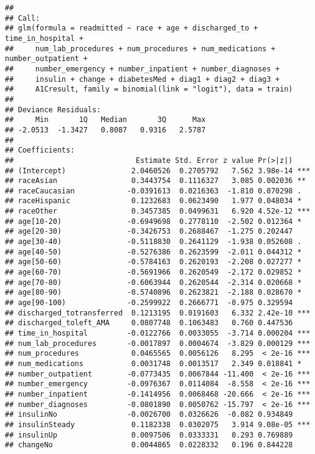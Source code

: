 \documentclass[]{article}
\begin{document}
\begin{verbatim}
## 
## Call:
## glm(formula = readmitted ~ race + age + discharged_to + time_in_hospital + 
##     num_lab_procedures + num_procedures + num_medications + number_outpatient + 
##     number_emergency + number_inpatient + number_diagnoses + 
##     insulin + change + diabetesMed + diag1 + diag2 + diag3 + 
##     A1Cresult, family = binomial(link = "logit"), data = train)
## 
## Deviance Residuals: 
##     Min       1Q   Median       3Q      Max  
## -2.0513  -1.3427   0.8087   0.9316   2.5787  
## 
## Coefficients:
##                            Estimate Std. Error z value Pr(>|z|)    
## (Intercept)               2.0460526  0.2705792   7.562 3.98e-14 ***
## raceAsian                 0.3443754  0.1116327   3.085 0.002036 ** 
## raceCaucasian            -0.0391613  0.0216363  -1.810 0.070298 .  
## raceHispanic              0.1232683  0.0623490   1.977 0.048034 *  
## raceOther                 0.3457385  0.0499631   6.920 4.52e-12 ***
## age[10-20)               -0.6949698  0.2778110  -2.502 0.012364 *  
## age[20-30)               -0.3426753  0.2688467  -1.275 0.202447    
## age[30-40)               -0.5118830  0.2641129  -1.938 0.052608 .  
## age[40-50)               -0.5276386  0.2623599  -2.011 0.044312 *  
## age[50-60)               -0.5784163  0.2620193  -2.208 0.027277 *  
## age[60-70)               -0.5691966  0.2620549  -2.172 0.029852 *  
## age[70-80)               -0.6063944  0.2620544  -2.314 0.020668 *  
## age[80-90)               -0.5740896  0.2623821  -2.188 0.028670 *  
## age[90-100)              -0.2599922  0.2666771  -0.975 0.329594    
## discharged_totransferred  0.1213195  0.0191603   6.332 2.42e-10 ***
## discharged_toleft_AMA     0.0807748  0.1063483   0.760 0.447536    
## time_in_hospital         -0.0122766  0.0033055  -3.714 0.000204 ***
## num_lab_procedures       -0.0017897  0.0004674  -3.829 0.000129 ***
## num_procedures            0.0465565  0.0056126   8.295  < 2e-16 ***
## num_medications           0.0031748  0.0013517   2.349 0.018841 *  
## number_outpatient        -0.0773435  0.0067844 -11.400  < 2e-16 ***
## number_emergency         -0.0976367  0.0114084  -8.558  < 2e-16 ***
## number_inpatient         -0.1414956  0.0068468 -20.666  < 2e-16 ***
## number_diagnoses         -0.0801890  0.0050762 -15.797  < 2e-16 ***
## insulinNo                -0.0026700  0.0326626  -0.082 0.934849    
## insulinSteady             0.1182338  0.0302075   3.914 9.08e-05 ***
## insulinUp                 0.0097506  0.0333331   0.293 0.769889    
## changeNo                  0.0044865  0.0228332   0.196 0.844228    

\end{verbatim}
\end{document}
